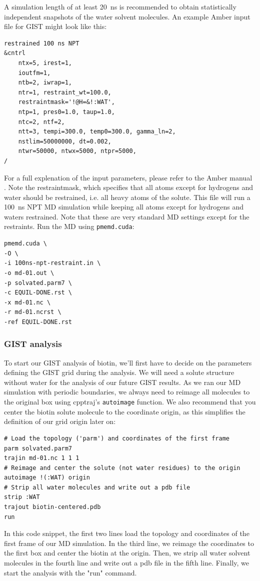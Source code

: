 \documentclass[9pt,tutorial]{livecoms}
\newcommand{\software}{\texttt}
\newcommand\inlinecode{\texttt}
\begin{document}
A simulation length of at least \qty{20}{\nano\second} is recommended to obtain statistically independent snapshots of the water solvent molecules. 
An example Amber input file for GIST might look like this:
\begin{lstlisting}[style=amber-in]
restrained 100 ns NPT
&cntrl
	ntx=5, irest=1,
	ioutfm=1,
	ntb=2, iwrap=1,
	ntr=1, restraint_wt=100.0,
	restraintmask='!@H=&!:WAT',
	ntp=1, pres0=1.0, taup=1.0,
	ntc=2, ntf=2,
	ntt=3, tempi=300.0, temp0=300.0, gamma_ln=2,
	nstlim=50000000, dt=0.002,
	ntwr=50000, ntwx=5000, ntpr=5000,
/
\end{lstlisting}
For a full explenation of the input parameters, please refer to the Amber manual \cite{amber24}.
Note the restraintmask, which specifies that all atoms except for hydrogens and water should be restrained, i.e. all heavy atoms of the solute.
This file will run a \qty{100}{\nano\second} NPT MD simulation while keeping all atoms except for hydrogens and waters restrained.
Note that these are very standard MD settings except for the restraints.
Run the MD using \software{pmemd.cuda}:
\begin{lstlisting}[style=bash]
pmemd.cuda \ 
-O \
-i 100ns-npt-restraint.in \
-o md-01.out \
-p solvated.parm7 \
-c EQUIL-DONE.rst \
-x md-01.nc \
-r md-01.ncrst \
-ref EQUIL-DONE.rst
\end{lstlisting}
\subsubsection{GIST analysis}

To start our GIST analysis of biotin, we'll first have to decide on the parameters defining the GIST grid during the analysis.
We will need a solute structure without water for the analysis of our future GIST results. 
As we ran our MD simulation with periodic boundaries, we always need to reimage all molecules to the original box using cpptraj's \inlinecode{autoimage} function. 
We also recommend that you center the biotin solute molecule to the coordinate origin, as this simplifies the definition of our grid origin later on:

\begin{lstlisting}[style=cpptraj]
# Load the topology ('parm') and coordinates of the first frame
parm solvated.parm7 
trajin md-01.nc 1 1 1 
# Reimage and center the solute (not water residues) to the origin
autoimage !(:WAT) origin 
# Strip all water molecules and write out a pdb file
strip :WAT 
trajout biotin-centered.pdb 
run
\end{lstlisting}
In this code snippet, the first two lines load the topology and coordinates of the first frame of our MD simulation.
In the third line, we reimage the coordinates to the first box and center the biotin at the origin. 
Then, we strip all water solvent molecules in the fourth line and write out a pdb file in the fifth line. 
Finally, we start the analysis with the "run" command.
\end{document}
